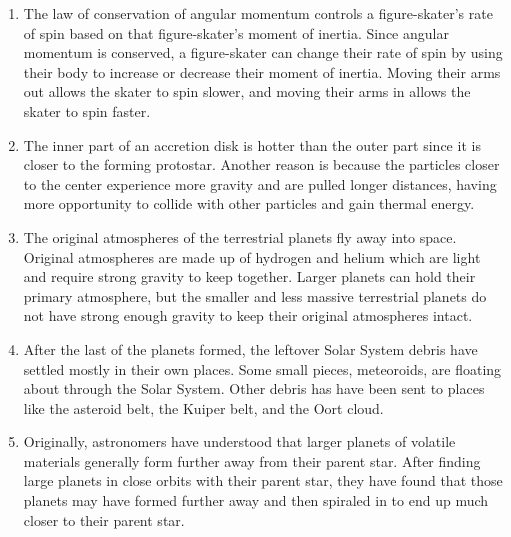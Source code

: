 \documentclass[../hw2.tex]{subfiles}
\begin{document}
    \begin{enumerate}
        \item The law of conservation of angular momentum controls a figure-skater's rate of spin based on that figure-skater's moment of inertia. Since angular momentum is conserved, a figure-skater can change their rate of spin by using their body to increase or decrease their moment of inertia. Moving their arms out allows the skater to spin slower, and moving their arms in allows the skater to spin faster.
        \item The inner part of an accretion disk is hotter than the outer part since it is closer to the forming protostar. Another reason is because the particles closer to the center experience more gravity and are pulled longer distances, having more opportunity to collide with other particles and gain thermal energy.
        \item The original atmospheres of the terrestrial planets fly away into space. Original atmospheres are made up of hydrogen and helium which are light and require strong gravity to keep together. Larger planets can hold their primary atmosphere, but the smaller and less massive terrestrial planets do not have strong enough gravity to keep their original atmospheres intact.
        \item After the last of the planets formed, the leftover Solar System debris have settled mostly in their own places. Some small pieces, meteoroids, are floating about through the Solar System. Other debris has have been sent to places like the asteroid belt, the Kuiper belt, and the Oort cloud.
        \item Originally, astronomers have understood that larger planets of volatile materials generally form further away from their parent star. After finding large planets in close orbits with their parent star, they have found that those planets may have formed further away and then spiraled in to end up much closer to their parent star.
    \end{enumerate}
\end{document}
